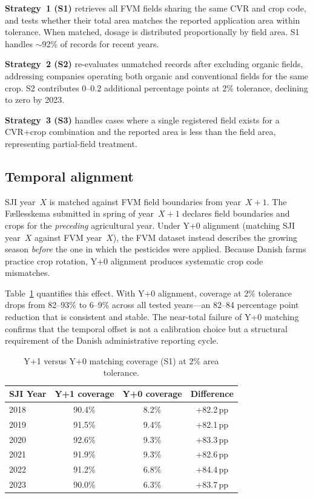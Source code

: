 \documentclass[12pt,a4paper]{article}
\begin{document}
\textbf{Strategy~1 (S1)} retrieves all FVM fields sharing the same CVR and crop code, and tests whether their total area matches the reported application area within tolerance. When matched, dosage is distributed proportionally by field area. S1 handles $\sim$92\% of records for recent years.

\textbf{Strategy~2 (S2)} re-evaluates unmatched records after excluding organic fields, addressing companies operating both organic and conventional fields for the same crop. S2 contributes 0--0.2 additional percentage points at 2\% tolerance, declining to zero by 2023.

\textbf{Strategy~3 (S3)} handles cases where a single registered field exists for a CVR+crop combination and the reported area is less than the field area, representing partial-field treatment.

\subsection{Temporal alignment}

SJI year~$X$ is matched against FVM field boundaries from year~$X+1$. The F\ae llesskema submitted in spring of year~$X+1$ declares field boundaries and crops for the \textit{preceding} agricultural year. Under Y+0 alignment (matching SJI year~$X$ against FVM year~$X$), the FVM dataset instead describes the growing season \textit{before} the one in which the pesticides were applied. Because Danish farms practice crop rotation, Y+0 alignment produces systematic crop code mismatches.

Table~\ref{tab:alignment} quantifies this effect. With Y+0 alignment, coverage at 2\% tolerance drops from 82--93\% to 6--9\% across all tested years---an 82--84 percentage point reduction that is consistent and stable. The near-total failure of Y+0 matching confirms that the temporal offset is not a calibration choice but a structural requirement of the Danish administrative reporting cycle.

\begin{table}[H]
\centering
\caption{Y+1 versus Y+0 matching coverage (S1) at 2\% area tolerance.}
\label{tab:alignment}
\begin{tabular}{@{}lccc@{}}
\toprule
SJI Year & Y+1 coverage & Y+0 coverage & Difference \\
\midrule
2018 & 90.4\% & 8.2\% & +82.2\,pp \\
2019 & 91.5\% & 9.4\% & +82.1\,pp \\
2020 & 92.6\% & 9.3\% & +83.3\,pp \\
2021 & 91.9\% & 9.3\% & +82.6\,pp \\
2022 & 91.2\% & 6.8\% & +84.4\,pp \\
2023 & 90.0\% & 6.3\% & +83.7\,pp \\
\bottomrule
\end{tabular}
\end{table}
\end{document}
